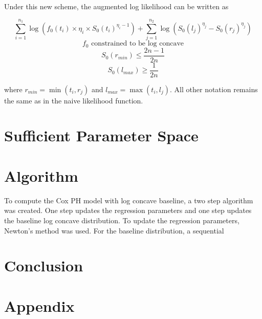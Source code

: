 \documentclass[11pt]{article}
\numberwithin{equation}{section}
\begin{document}
	Under this new scheme, the augmented log likelihood can be written as 		
			
\[
	\displaystyle \sum_{i = 1}^{n_1} \log (f_0(t_i) \times \eta_i \times S_0(t_i)^{\eta_i - 1})  +
	\displaystyle \sum_{j = 1}^{n_2} \log( S_0( l_j )^{\eta_j} - S_0({r_j})^{\eta_j} ) 
\]	
\[
	f_0 \text{ constrained to be log concave}
\]
\[
	S_0( r_{min}) \le \frac{2n-1}{2n}
\]			
\[
	S_0( l_{max} ) \ge \frac{1}{2n} 
\]

	where $r_{min} = \min(t_i, r_j)$ and $l_{max} = \max(t_i, l_j)$. All other notation remains the same as in the naive likelihood function. 

{\section{Sufficient Parameter Space}}


{\section{Algorithm} }
		
	To compute the Cox PH model with log concave baseline, a two step algorithm was created. One step updates the regression parameters and one step updates the baseline log concave distribution. To update the regression parameters, Newton's method was used. For the baseline distribution, a sequential 
		
{\section{Conclusion} }

{\section{Appendix}}
 
 
\end{document}
